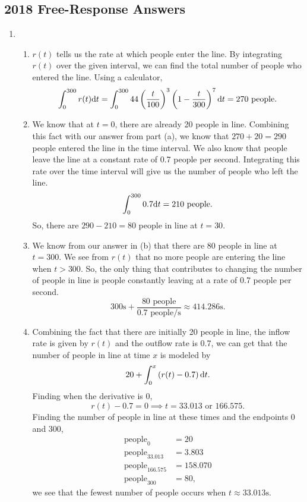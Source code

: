 \subsection{2018 Free-Response Answers}
\begin{enumerate}
	\item \begin{enumerate}
		\item $r(t)$ tells us the rate at which people enter the line.
			By integrating $r(t)$ over the given interval, we can find the total number of people who entered the line.
			Using a calculator,
			\begin{equation*}
				\int_{0}^{300}{r(t)\mathrm{d} t} = \int_{0}^{300}{44\left(\frac{t}{100}\right)^3\left(1-\frac{t}{300}\right)^7\mathrm{d} t} = 270 \text{ people}.
			\end{equation*}
		\item We know that at $t=0$, there are already 20 people in line.
			Combining this fact with our answer from part (a), we know that $270+20=290$ people entered the line in the time interval.
			We also know that people leave the line at a constant rate of 0.7 people per second.
			Integrating this rate over the time interval will give us the number of people who left the line.
			\begin{equation*}
				\int_{0}^{300}{0.7\mathrm{d} t} = 210 \text{ people}.
			\end{equation*}
			So, there are $290-210=80$ people in line at $t=30$.
		\item We know from our answer in (b) that there are 80 people in line at $t=300$.
			We see from $r(t)$ that no more people are entering the line when $t>300$.
			So, the only thing that contributes to changing the number of people in line is people constantly leaving at a rate of 0.7 people per second.
			\begin{equation*}
				300\text{s} + \frac{80 \text{ people}}{0.7\text{ people/s}} \approx 414.286\text{s}.
			\end{equation*}
		\item Combining the fact that there are initially 20 people in line, the inflow rate is given by $r(t)$ and the outflow rate is 0.7, we can get that the number of people in line at time $x$ is modeled by
		\begin{equation*}
			20 + \int_{0}^{x}{\left(r(t)-0.7\right)\mathrm{d} t}.
		\end{equation*}
		Finding when the derivative is 0,
		\begin{equation*}
			r(t) - 0.7 = 0 \implies t = 33.013 \text{ or } 166.575.
		\end{equation*}
		Finding the number of people in line at these times and the endpoints 0 and 300,
		\begin{align*}
			\text{people}_{0} &= 20 \\
			\text{people}_{33.013} &= 3.803 \\
			\text{people}_{166.575} &= 158.070 \\
			\text{people}_{300} &= 80,
		\end{align*}
		we see that the fewest number of people occurs when $t\approx 33.013\text{s}$.
	\end{enumerate}


\end{enumerate}
